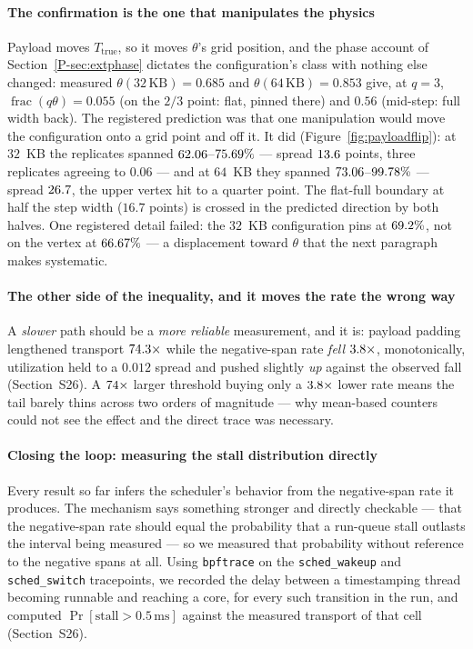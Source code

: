 \documentclass[10pt,journal,onecolumn]{IEEEtran}
\newcommand{\mainPhase}{\ref{P-sec:extphase}}            %
\begin{document}
\paragraph{The confirmation is the one that manipulates the physics} Payload moves
$T_{\mathrm{true}}$, so it moves $\theta$'s grid position, and the phase account of Section~\mainPhase{} dictates the configuration's class with nothing else changed: measured $\theta(32\,\text{KB}) =
0.685$ and $\theta(64\,\text{KB}) = 0.853$ give, at $q=3$,
$\operatorname{frac}(q\theta) = 0.055$ (on the $2/3$ point: flat, pinned there) and $0.56$
(mid-step: full width back). The registered prediction was that one manipulation would move
the configuration onto a grid point and off it.
It did (Figure~\ref{fig:payloadflip}): at $32$~KB the
\flipReplicatesThirtyTwoWord{} replicates spanned
$62.06$--$75.69\%$ --- spread
$13.6$ points, three replicates agreeing to $0.06$ --- and at $64$~KB they
spanned $73.06$--$99.78\%$ --- spread
$26.7$, the upper vertex hit to a quarter point. The flat-full
boundary at half the step width ($16.7$ points) is crossed in the predicted direction by both
halves. One registered detail failed: the $32$~KB configuration pins at $69.2\%$, not on
the vertex at $66.67\%$ --- a
displacement toward $\theta$ that the next paragraph makes systematic.

\paragraph{The other side of the inequality, and it moves the rate the wrong way} A
\emph{slower} path should be a \emph{more reliable} measurement, and it is: payload padding
lengthened transport $74.3\times$ while the negative-span rate \emph{fell} $3.8\times$,
monotonically, utilization held to a $0.012$ spread and pushed slightly \emph{up} against
the observed fall (Section~S26). A $74\times$ larger threshold buying only a
$3.8\times$ lower rate means the tail barely thins across two orders of magnitude --- why
mean-based counters could not see the effect and the direct trace was necessary.

\paragraph{Closing the loop: measuring the stall distribution directly} Every result so
far infers the scheduler's behavior from the negative-span rate it produces. The mechanism says
something stronger and directly checkable --- that the negative-span rate should equal the probability
that a run-queue stall outlasts the interval being measured --- so we measured that probability
without reference to the negative spans at all. Using \texttt{bpftrace} on the \texttt{sched\_wakeup}
and \texttt{sched\_switch} tracepoints, we recorded the delay between a timestamping thread becoming
runnable and reaching a core, for every such transition in the run, and computed
$\Pr[\text{stall} > 0.5\,\text{ms}]$ against the measured transport of that cell
(Section~S26).
\end{document}
